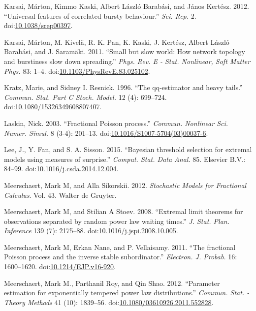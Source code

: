 \documentclass[smallextended]{svjour3}       %
\begin{document}
\hypertarget{ref-Karsai2012}{}
Karsai, Márton, Kimmo Kaski, Albert László Barabási, and János Kertész.
2012. ``Universal features of correlated bursty behaviour.'' \emph{Sci.
Rep.} 2.
doi:\href{https://doi.org/10.1038/srep00397}{10.1038/srep00397}.

\hypertarget{ref-Karsai2011}{}
Karsai, Márton, M. Kivelä, R. K. Pan, K. Kaski, J. Kertész, Albert
László Barabási, and J. Saramäki. 2011. ``Small but slow world: How
network topology and burstiness slow down spreading.'' \emph{Phys. Rev.
E - Stat. Nonlinear, Soft Matter Phys.} 83: 1--4.
doi:\href{https://doi.org/10.1103/PhysRevE.83.025102}{10.1103/PhysRevE.83.025102}.

\hypertarget{ref-Kratz96}{}
Kratz, Marie, and Sidney I. Resnick. 1996. ``The qq-estimator and heavy
tails.'' \emph{Commun. Stat. Part C Stoch. Model.} 12 (4): 699--724.
doi:\href{https://doi.org/10.1080/15326349608807407}{10.1080/15326349608807407}.

\hypertarget{ref-Laskin2003}{}
Laskin, Nick. 2003. ``Fractional Poisson process.'' \emph{Commun.
Nonlinear Sci. Numer. Simul.} 8 (3-4): 201--13.
doi:\href{https://doi.org/10.1016/S1007-5704(03)00037-6}{10.1016/S1007-5704(03)00037-6}.

\hypertarget{ref-Lee15}{}
Lee, J., Y. Fan, and S. A. Sisson. 2015. ``Bayesian threshold selection
for extremal models using measures of surprise.'' \emph{Comput. Stat.
Data Anal.} 85. Elsevier B.V.: 84--99.
doi:\href{https://doi.org/10.1016/j.csda.2014.12.004}{10.1016/j.csda.2014.12.004}.

\hypertarget{ref-MeerschaertSikorskii}{}
Meerschaert, Mark M, and Alla Sikorskii. 2012. \emph{Stochastic Models
for Fractional Calculus}. Vol. 43. Walter de Gruyter.

\pagebreak

\hypertarget{ref-MeerschaertStoev08}{}
Meerschaert, Mark M, and Stilian A Stoev. 2008. ``Extremal limit
theorems for observations separated by random power law waiting times.''
\emph{J. Stat. Plan. Inference} 139 (7): 2175--88.
doi:\href{https://doi.org/10.1016/j.jspi.2008.10.005}{10.1016/j.jspi.2008.10.005}.

\hypertarget{ref-Meerschaert2010b}{}
Meerschaert, Mark M, Erkan Nane, and P. Vellaisamy. 2011. ``The
fractional Poisson process and the inverse stable subordinator.''
\emph{Electron. J. Probab.} 16: 1600--1620.
doi:\href{https://doi.org/10.1214/EJP.v16-920}{10.1214/EJP.v16-920}.

\hypertarget{ref-MeerschaertRoyQin}{}
Meerschaert, Mark M., Parthanil Roy, and Qin Shao. 2012. ``Parameter
estimation for exponentially tempered power law distributions.''
\emph{Commun. Stat. - Theory Methods} 41 (10): 1839--56.
doi:\href{https://doi.org/10.1080/03610926.2011.552828}{10.1080/03610926.2011.552828}.
\end{document}
